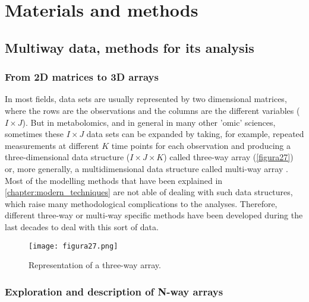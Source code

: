 \part{Materials and methods}

\chapter[Multiway data, methods for its analysis]{Multiway data, methods for its analysis}
\label{chapter:threeways}


\section{From 2D matrices to 3D arrays}
In most fields, data sets are usually represented by two dimensional matrices, where the rows are the observations and the columns are the different variables ($I \times J$). But in metabolomics, and in general in many other 'omic' sciences, sometimes these $I \times J$ data sets can be expanded by taking, for example, repeated measurements at different $K$ time points for each observation and producing a three-dimensional data structure ($I \times J \times K$) called three-way array (\autoref{figura27}) or, more generally, a multidimensional data structure called multi-way array \parencite{kroonenberg2016my}. Most of the modelling methods that have been explained in \autoref{chapter:modern_techniques} are not able of dealing with such data structures, which raise many methodological complications to the analyses. Therefore, different three-way or multi-way specific methods have been developed during the last decades to deal with this sort of data.

\begin{figure}[hbtp]
\centering
\texttt{[image: figura27.png]}
\caption{Representation of a three-way array.}
\label{figura27}
\end{figure}

\section{Exploration and description of N-way arrays}
